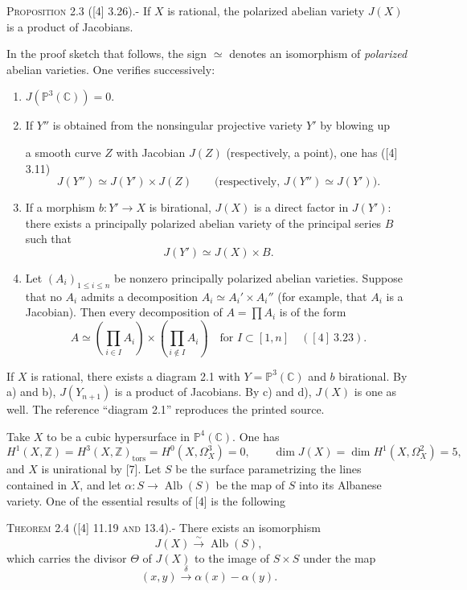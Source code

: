 \documentclass[10pt]{article}
\newcommand{\CC}{\mathbb C}
\newcommand{\PP}{\mathbb P}
\newcommand{\ZZ}{\mathbb Z}
\newcommand{\Alb}{\operatorname{Alb}}
\newcommand{\tors}{\mathrm{tors}}
\newcommand{\sourcehead}[1]{\par\medskip\noindent\textsc{#1}\quad}
\begin{document}
\sourcehead{Proposition 2.3 ([4] 3.26).-} If \(X\) is rational, the polarized
abelian variety \(J(X)\) is a product of Jacobians.

In the proof sketch that follows, the sign \(\simeq\) denotes an isomorphism of
\emph{polarized} abelian varieties. One verifies successively:
\begin{enumerate}[label=\alph*)]
\item \(J(\PP^3(\CC))=0\).
\item If \(Y''\) is obtained from the nonsingular projective variety \(Y'\) by
blowing up

a smooth curve \(Z\) with Jacobian \(J(Z)\) (respectively, a point), one has
([4] 3.11)
\[
  J(Y'')\simeq J(Y')\times J(Z)
  \qquad\bigl(\text{respectively, }J(Y'')\simeq J(Y')\bigr).
\]
\item If a morphism \(b:Y'\to X\) is birational, \(J(X)\) is a direct factor
in \(J(Y')\): there exists a principally polarized abelian variety of the
principal series \(B\) such that
\[
  J(Y')\simeq J(X)\times B.
\]
\item Let \((A_i)_{1\leq i\leq n}\) be nonzero principally polarized abelian
varieties. Suppose that no \(A_i\) admits a decomposition
\(A_i\simeq A_i'\times A_i''\) (for example, that \(A_i\) is a Jacobian). Then
every decomposition of \(A=\prod A_i\) is of the form
\[
  A\simeq\left(\prod_{i\in I}A_i\right)
  \times\left(\prod_{i\notin I}A_i\right)
  \quad\text{for }I\subset[1,n]\quad([4]~3.23).
\]
\end{enumerate}

If \(X\) is rational, there exists a diagram 2.1 with \(Y=\PP^3(\CC)\) and
\(b\) birational. By a) and b), \(J(Y_{n+1})\) is a product of Jacobians. By c)
and d), \(J(X)\) is one as well. The reference ``diagram 2.1'' reproduces the
printed source.

Take \(X\) to be a cubic hypersurface in \(\PP^4(\CC)\). One has
\[
  H^1(X,\ZZ)=H^3(X,\ZZ)_{\tors}=H^0(X,\Omega_X^3)=0,
  \qquad
  \dim J(X)=\dim H^1(X,\Omega_X^2)=5,
\]
and \(X\) is unirational by [7]. Let \(S\) be the surface parametrizing the
lines contained in \(X\), and let \(\alpha:S\to\Alb(S)\) be the map of \(S\)
into its Albanese variety. One of the essential results of [4] is the following

\sourcehead{Theorem 2.4 ([4] 11.19 and 13.4).-} There exists an isomorphism
\[
  J(X)\xrightarrow{\sim}\Alb(S),
\]
which carries the divisor \(\Theta\) of \(J(X)\) to the image of \(S\times S\)
under the map
\[
  (x,y)\xrightarrow{\delta}\alpha(x)-\alpha(y).
\]
\end{document}
